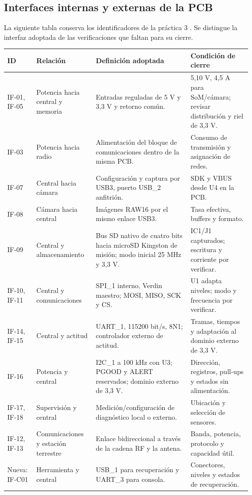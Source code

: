 \documentclass[11pt,letterpaper]{article}
\begin{document}
\subsection{Interfaces internas y externas de la PCB}
La siguiente tabla conserva los identificadores de la práctica 3 \cite{lab3}. Se distingue la interfaz adoptada de las verificaciones que faltan para su cierre.
\small
\begin{longtable}{L{2cm}L{3.1cm}L{5.5cm}L{3.3cm}}
\toprule ID & Relación & Definición adoptada & Condición de cierre \\
\midrule\endhead
IF-01, IF-05 & Potencia hacia central y memoria & Entradas reguladas de 5 V y 3,3 V y retorno común. & 5,10 V, 4,5 A para SoM/cámara; revisar distribución y riel de 3,3 V. \\
IF-03 & Potencia hacia radio & Alimentación del bloque de comunicaciones dentro de la misma PCB. & Consumo de transmisión y asignación de redes. \\
IF-07 & Central hacia cámara & Configuración y captura por USB3, puerto USB\_2 anfitrión. & SDK y VBUS desde U4 en la PCB. \\
IF-08 & Cámara hacia central & Imágenes RAW16 por el mismo enlace USB3. & Tasa efectiva, buffers y formato. \\
IF-09 & Central y almacenamiento & Bus SD nativo de cuatro bits hacia microSD Kingston de misión; modo inicial 25 MHz y 3,3 V. & IC1/J1 capturados; escritura y corriente por verificar. \\
IF-10, IF-11 & Central y comunicaciones & SPI\_1 interno, Verdin maestro; MOSI, MISO, SCK y CS. & U1 adapta niveles; modo y frecuencia por verificar. \\
IF-14, IF-15 & Central y actitud & UART\_1, 115200 bit/s, 8N1; controlador externo de actitud. & Tramas, tiempos y adaptación al dominio externo de 3,3 V. \\
IF-16 & Potencia y central & I2C\_1 a 100 kHz con U3; PGOOD y ALERT reservados; dominio externo de 3,3 V. & Dirección, registros, pull-ups y estados sin alimentación. \\
IF-17, IF-18 & Supervisión y central & Medición/configuración de diagnóstico local o externo. & Ubicación y selección de sensores. \\
IF-12, IF-13 & Comunicaciones y estación terrestre & Enlace bidireccional a través de la cadena RF y la antena. & Banda, potencia, protocolo y capacidad útil. \\
Nueva: IF-C01 & Herramienta y central & USB\_1 para recuperación y UART\_3 para consola. & Conectores, niveles y estados de recuperación. \\
\bottomrule
\end{longtable}
\end{document}
